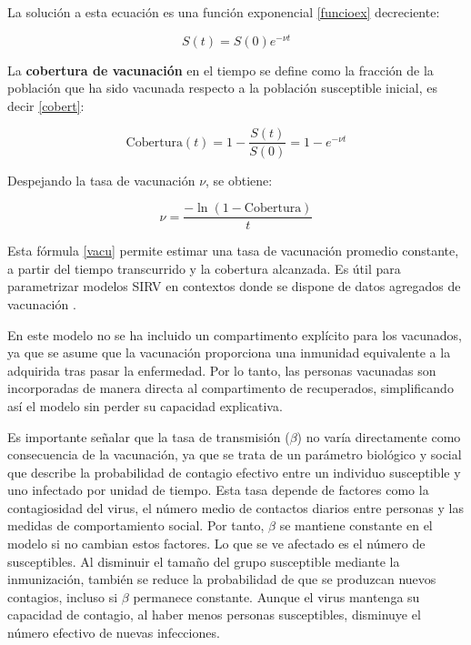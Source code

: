 \begin{itemize}
La solución a esta ecuación es una función exponencial \eqref{funcioex} decreciente:

\begin{equation}
S(t) = S(0) e^{-\nu t}
\label{funcioex}
\end{equation}

La \textbf{cobertura de vacunación} en el tiempo se define como la fracción de la población que ha sido vacunada respecto a la población susceptible inicial, es decir \eqref{cobert}:

\begin{equation}
\text{Cobertura}(t) = 1 - \frac{S(t)}{S(0)} = 1 - e^{-\nu t}
\label{cobert}
\end{equation}

Despejando la tasa de vacunación $\nu$, se obtiene:

\begin{equation}
\nu = \frac{-\ln(1 - \text{Cobertura})}{t}
\label{vacu}
\end{equation}

Esta fórmula \eqref{vacu} permite estimar una tasa de vacunación promedio constante, a partir del tiempo transcurrido y la cobertura alcanzada. Es útil para parametrizar modelos SIRV en contextos donde se dispone de datos agregados de vacunación \cite{anderson1991infectious}.





\end{itemize}

En este modelo no se ha incluido un compartimento explícito para los vacunados, ya que se asume que la vacunación proporciona una inmunidad equivalente a la adquirida tras pasar la enfermedad. Por lo tanto, las personas vacunadas son incorporadas de manera directa al compartimento de recuperados, simplificando así el modelo sin perder su capacidad explicativa. 

Es importante señalar que la tasa de transmisión ($\beta$) no varía directamente como consecuencia de la vacunación, ya que se trata de un parámetro biológico y social que describe la probabilidad de contagio efectivo entre un individuo susceptible y uno infectado por unidad de tiempo. Esta tasa depende de factores como la contagiosidad del virus, el número medio de contactos diarios entre personas y las medidas de comportamiento social.
Por tanto, $\beta$ se mantiene constante en el modelo si no cambian estos factores. Lo que se ve afectado es el número de susceptibles. Al disminuir el tamaño del grupo susceptible mediante la inmunización, también se reduce la probabilidad de que se produzcan nuevos contagios, incluso si $\beta$ permanece constante. Aunque el virus mantenga su capacidad de contagio, al haber menos personas susceptibles, disminuye el número efectivo de nuevas infecciones.


